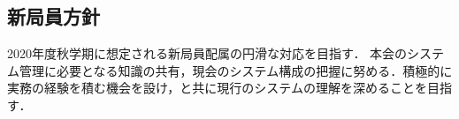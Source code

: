 \subsection*{新局員方針}


2020年度秋学期に想定される新局員配属の円滑な対応を目指す．
本会のシステム管理に必要となる知識の共有，現会のシステム構成の把握に努める．積極的に実務の経験を積む機会を設け，\secondGrade{}と共に現行のシステムの理解を深めることを目指す．

